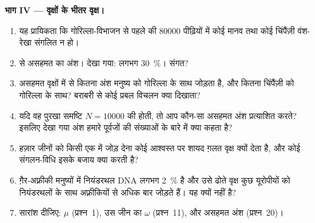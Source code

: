\begin{problem}
\medskip
\noindent\textbf{भाग IV --- वृक्षों के भीतर वृक्ष।}
\begin{enumerate}[resume]
  \item यह प्रायिकता कि गोरिल्ला-विभाजन से पहले की \num{80000}
        पीढ़ियों में कोई मानव तथा कोई चिंपैंज़ी वंश-रेखा संगलित न हो।
  \item {} से असहमत  का अंश। देखा गया: लगभग
        \qty{30}{\%}। संगत?
  \item असहमत वृक्षों में से कितना अंश मनुष्य को गोरिल्ला के साथ जोड़ता
        है, और कितना चिंपैंज़ी को गोरिल्ला के साथ? बराबरी से कोई प्रबल
        विचलन क्या दिखाता?
  \item यदि वह पुरखा समष्टि $N = \num{10000}$ की होती, तो आप कौन-सा
        असहमत अंश प्रत्याशित करते? इसलिए देखा गया अंश हमारे पूर्वजों की
        संख्याओं के बारे में क्या कहता है?
  \item हज़ार जीनों को किसी एक  में जोड़ देना कोई आश्वस्त पर शायद
        ग़लत वृक्ष क्यों देता है, और कोई संगलन-विधि इसके बजाय क्या करती
        है?
  \item ग़ैर-अफ़्रीकी मनुष्यों में नियंडरथल DNA लगभग \qty{2}{\%} है और
        उसे ढोते वृक्ष कुछ यूरोपीयों को नियंडरथलों के साथ अफ़्रीकियों से
        अधिक बार जोड़ते हैं। यह  क्यों नहीं है?
  \item सारांश दीजिए: $\mu$ (प्रश्न~1), उस जीन का $\omega$
        (प्रश्न~11), और असहमत अंश (प्रश्न~20)।
\end{enumerate}
\end{problem}
